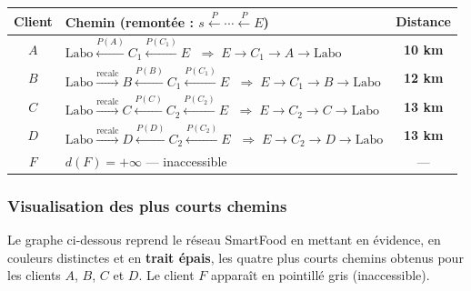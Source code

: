 \documentclass[12pt,a4paper]{article}
\begin{document}
\begin{landscape}
\begin{center}\small
\begin{tabular}{c|l|c}
\toprule
\textbf{Client} & \textbf{Chemin (remontée : $s \xleftarrow{P} \cdots \xleftarrow{P} E$)} & \textbf{Distance}\\
\midrule
$A$ & $\mathrm{Labo}\xleftarrow{P(A)}C_1\xleftarrow{P(C_1)}E$
    $\;\Rightarrow\; E\to C_1\to A\to\mathrm{Labo}$ & \textbf{10 km}\\
$B$ & $\mathrm{Labo}\xrightarrow{\text{recalc}}B\xleftarrow{P(B)}C_1\xleftarrow{P(C_1)}E$
    $\;\Rightarrow\; E\to C_1\to B\to\mathrm{Labo}$ & \textbf{12 km}\\
$C$ & $\mathrm{Labo}\xrightarrow{\text{recalc}}C\xleftarrow{P(C)}C_2\xleftarrow{P(C_2)}E$
    $\;\Rightarrow\; E\to C_2\to C\to\mathrm{Labo}$ & \textbf{13 km}\\
$D$ & $\mathrm{Labo}\xrightarrow{\text{recalc}}D\xleftarrow{P(D)}C_2\xleftarrow{P(C_2)}E$
    $\;\Rightarrow\; E\to C_2\to D\to\mathrm{Labo}$ & \textbf{13 km}\\
$F$ & $d(F)=+\infty$ — inaccessible & —\\
\bottomrule
\end{tabular}
\end{center}

\end{landscape}

\subsubsection{Visualisation des plus courts chemins}

Le graphe ci-dessous reprend le réseau SmartFood en mettant en évidence, en couleurs
distinctes et en \textbf{trait épais}, les quatre plus courts chemins obtenus pour les
clients $A$, $B$, $C$ et $D$. Le client $F$ apparaît en pointillé gris (inaccessible).
\end{document}
